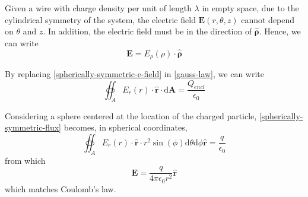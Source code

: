 \documentclass{report}
\newcommand{\uvec}[1]{\boldsymbol{\hat{\textbf{$#1$}}}}
\newcommand{\be}{\begin{equation}}
\newcommand{\ee}{\end{equation}}
\begin{document}
Given a wire with charge density per unit of length $\lambda$ in empty space, due to the cylindrical symmetry of the system, the electric field $\mathbf{E}(r,\theta,z)$ cannot depend on $\theta$ and $z$. In addition, the electric field must be in the direction of $\uvec{\rho}$. Hence, we can write
\be\label{cylindrically-symmetric-e-field}
\mathbf{E} = E_{\rho}(\rho) \cdot \uvec{\rho}
\ee

By replacing \ref{spherically-symmetric-e-field} in \ref{gauss-law}, we can write
\be\label{cylindrically-symmetric-flux}
\oiint_A E_r(r) \cdot \uvec{r} \cdot \mathrm{d}\mathbf{A} =\frac{Q_{encl}}{\epsilon_0}
\ee

Considering a sphere centered at the location of the charged particle, \ref{spherically-symmetric-flux} becomes, in spherical coordinates,
\be\label{cylindrically-symmetric-flux-2}
\oiint_A E_r(r) \cdot \uvec{r} \cdot r^{2}\sin(\phi)\mathrm{d}\theta\mathrm{d}\phi\uvec{r} =\frac{q}{\epsilon_0}
\ee
from which
\be
\mathbf{E}=\frac{q}{4\pi\epsilon_0 r^{2}}\uvec{r}
\ee
which matches Coulomb's law.
\end{document}
